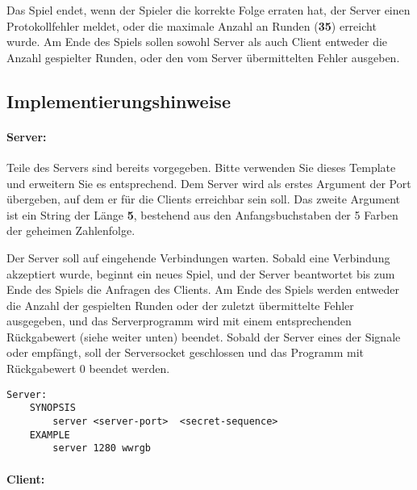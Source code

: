 Das Spiel endet, wenn der Spieler die korrekte Folge erraten hat, der Server
einen Protokollfehler meldet, oder die maximale Anzahl an Runden (\textbf{35})
erreicht wurde. Am Ende des Spiels sollen sowohl Server als auch Client
entweder die Anzahl gespielter Runden, oder den vom Server übermittelten
Fehler ausgeben.

\subsection*{Implementierungshinweise}
\label{sec:implhints}
\paragraph{Server:}
Teile des Servers sind bereits vorgegeben. Bitte verwenden Sie dieses Template
und erweitern Sie es entsprechend.  Dem Server wird als erstes Argument der Port
übergeben, auf dem er für die Clients erreichbar sein soll. Das zweite Argument
ist ein String der Länge \textbf{5}, bestehend aus den Anfangsbuchstaben der 5
Farben der geheimen Zahlenfolge.


Der Server soll auf eingehende Verbindungen warten. Sobald eine Verbindung
akzeptiert wurde, beginnt ein neues Spiel, und der Server beantwortet bis zum
Ende des Spiels die Anfragen des Clients. Am Ende des Spiels werden entweder die
Anzahl der gespielten Runden oder der zuletzt übermittelte Fehler ausgegeben,
und das Serverprogramm wird mit einem entsprechenden Rückgabewert (siehe weiter
unten) beendet. Sobald der Server eines der Signale  oder
 empfängt, soll der Serversocket geschlossen und das
Programm mit Rückgabewert 0 beendet werden.

\begin{verbatim}
Server:
    SYNOPSIS
        server <server-port>  <secret-sequence>
    EXAMPLE
        server 1280 wwrgb
\end{verbatim}

\paragraph{Client:}

